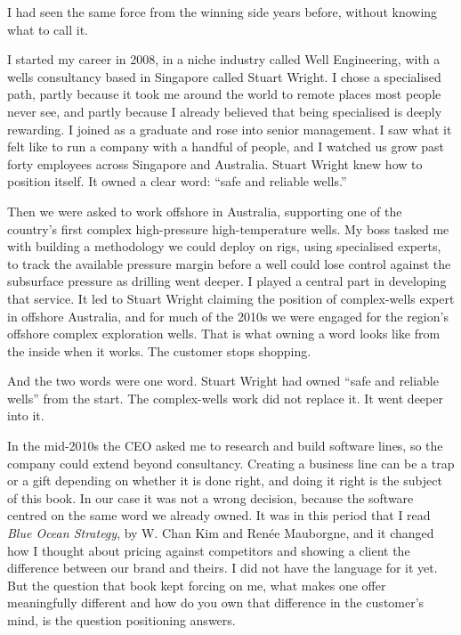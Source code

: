 \documentclass[10pt,twoside,openany]{memoir}
\begin{document}
I had seen the same force from the winning side years before, without
knowing what to call it.

I started my career in 2008, in a niche industry called Well
Engineering, with a wells consultancy based in Singapore called Stuart
Wright. I chose a specialised path, partly because it took me around the
world to remote places most people never see, and partly because I
already believed that being specialised is deeply rewarding. I joined as
a graduate and rose into senior management. I saw what it felt like to
run a company with a handful of people, and I watched us grow past forty
employees across Singapore and Australia. Stuart Wright knew how to
position itself. It owned a clear word: ``safe and reliable wells.''

Then we were asked to work offshore in Australia, supporting one of the
country's first complex high-pressure high-temperature wells. My boss
tasked me with building a methodology we could deploy on rigs, using
specialised experts, to track the available pressure margin before a
well could lose control against the subsurface pressure as drilling went
deeper. I played a central part in developing that service. It led to
Stuart Wright claiming the position of complex-wells expert in offshore
Australia, and for much of the 2010s we were engaged for the region's
offshore complex exploration wells. That is what owning a word looks
like from the inside when it works. The customer stops shopping.

And the two words were one word. Stuart Wright had owned ``safe and
reliable wells'' from the start. The complex-wells work did not replace
it. It went deeper into it.

In the mid-2010s the CEO asked me to research and build software lines,
so the company could extend beyond consultancy. Creating a business line
can be a trap or a gift depending on whether it is done right, and doing
it right is the subject of this book. In our case it was not a wrong
decision, because the software centred on the same word we already
owned. It was in this period that I read \emph{Blue Ocean
Strategy}\cite{kim2005}, by W. Chan Kim and Renée Mauborgne, and it
changed how I thought about pricing against competitors and showing a
client the difference between our brand and theirs. I did not have the
language for it yet. But the question that book kept forcing on me, what
makes one offer meaningfully different and how do you own that
difference in the customer's mind, is the question positioning answers.
\end{document}

